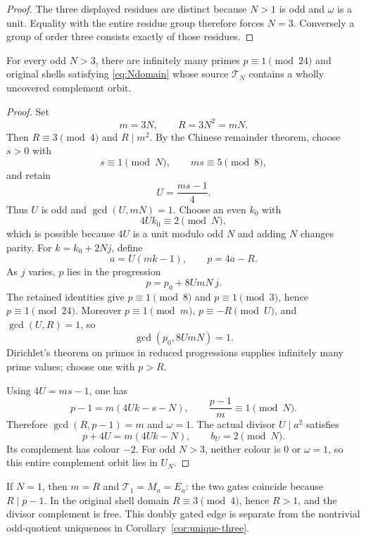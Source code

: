 \begin{proof}
The three displayed residues are distinct because $N>1$ is odd and $\omega$ is
a unit.  Equality with the entire residue group therefore forces $N=3$.
Conversely a group of order three consists exactly of those residues.
\end{proof}

\begin{proposition}
\label{prop:larger-quotient-sharp}
For every odd $N>3$, there are infinitely many primes $p\equiv1\pmod{24}$
and original shells satisfying \eqref{eq:Ndomain} whose source
$\mathcal T_N$ contains a wholly uncovered complement orbit.
\end{proposition}

\begin{proof}
Set
\[
 m=3N,\qquad R=3N^2=mN.                                        \tag{4.14}
\]
Then $R\equiv3\pmod4$ and $R\mid m^2$.  By the Chinese remainder theorem,
choose $s>0$ with
\[
 s\equiv1\pmod N,\qquad ms\equiv5\pmod8,                      \tag{4.15}
\]
and retain
\[
 U=\frac{ms-1}{4}.                                               \tag{4.16}
\]
Thus $U$ is odd and $\gcd(U,mN)=1$.  Choose an even $k_0$ with
\[
 4Uk_0\equiv2\pmod N,                                          \tag{4.17}
\]
which is possible because $4U$ is a unit modulo odd $N$ and adding $N$ changes
parity.  For $k=k_0+2Nj$, define
\[
 a=U(mk-1),\qquad p=4a-R.                                      \tag{4.18}
\]
As $j$ varies, $p$ lies in the progression
\[
 p=p_0+8UmN\,j.                                                  \tag{4.19}
\]
The retained identities give $p\equiv1\pmod8$ and $p\equiv1\pmod3$, hence
$p\equiv1\pmod{24}$.  Moreover $p\equiv1\pmod m$,
$p\equiv-R\pmod U$, and $\gcd(U,R)=1$, so
\[
 \gcd(p_0,8UmN)=1.
\]
Dirichlet's theorem on primes in reduced progressions
\citep[Theorem~18.1]{Sutherland} supplies infinitely many prime values; choose
one with $p>R$.

Using $4U=ms-1$, one has
\[
 p-1=m(4Uk-s-N),\qquad \frac{p-1}{m}\equiv1\pmod N.             \tag{4.20}
\]
Therefore $\gcd(R,p-1)=m$ and $\omega=1$.  The actual divisor $U\mid a^2$
satisfies
\[
 p+4U=m(4Uk-N),\qquad b_U=2\pmod N.                              \tag{4.21}
\]
Its complement has colour $-2$.  For odd $N>3$, neither colour is $0$ or
$\omega=1$, so this entire complement orbit lies in $U_N$.
\end{proof}

\begin{remark}
If $N=1$, then $m=R$ and $\mathcal T_1=M_a=E_a$: the two gates coincide because
$R\mid p-1$.  In the original shell domain $R\equiv3\pmod4$, hence $R>1$, and
the divisor complement is free.  This doubly gated edge is separate from the
nontrivial odd-quotient uniqueness in Corollary~\ref{cor:unique-three}.
\end{remark}

